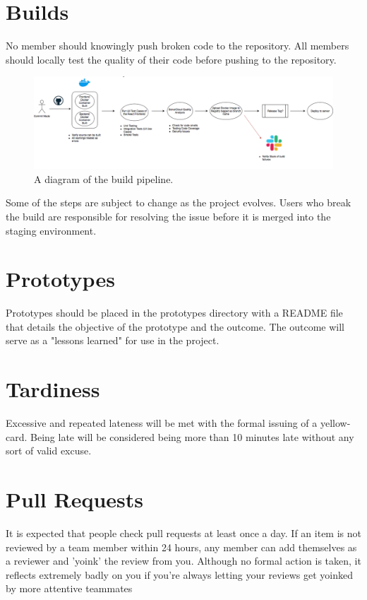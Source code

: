 \documentclass{scrreprt}
\begin{document}
\section{Builds}

No member should knowingly push broken code to the repository.
All members should locally test the quality of their code before
pushing to the repository. 

\begin{figure}[H]
    \includegraphics[width=\linewidth]{build-pipeline}
    \caption{A diagram of the build pipeline.}
    \label{fig:build}
\end{figure}

Some of the steps are subject to change as the project evolves.
Users who break the build are responsible for resolving the issue
before it is merged into the staging environment.

\section{Prototypes}

Prototypes should be placed in the prototypes directory with a README
file that details the objective of the prototype and the outcome. The
outcome will serve as a "lessons learned" for use in the project.

\section{Tardiness}

Excessive and repeated lateness will be met with the formal issuing of a yellow-card.  Being late will be considered being more than 10 minutes late without any sort of valid excuse.

\section{Pull Requests}

It is expected that people check pull requests at least once a day.  If an item is not reviewed by a team member within 24 hours, any member can add themselves as a reviewer and 'yoink' the review from you. Although no formal action is taken, it reflects extremely badly on you if you're always letting your reviews get yoinked by more attentive teammates
\end{document}

